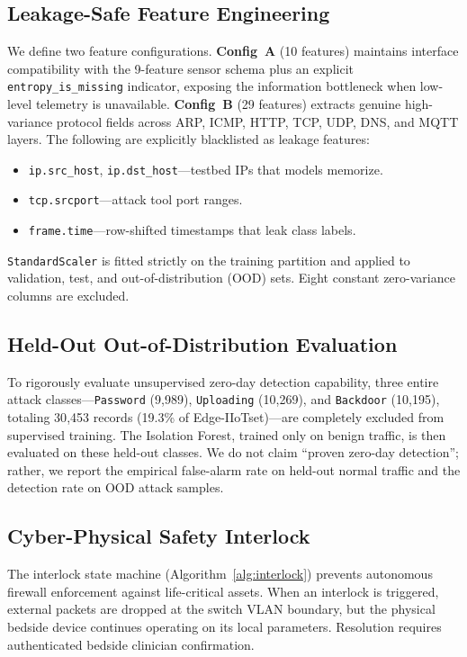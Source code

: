 \documentclass[conference]{IEEEtran}
\begin{document}
\subsection{Leakage-Safe Feature Engineering}
We define two feature configurations. \textbf{Config~A} (10 features) maintains interface compatibility with the 9-feature sensor schema plus an explicit \texttt{entropy\_is\_missing} indicator, exposing the information bottleneck when low-level telemetry is unavailable. \textbf{Config~B} (29 features) extracts genuine high-variance protocol fields across ARP, ICMP, HTTP, TCP, UDP, DNS, and MQTT layers. The following are explicitly blacklisted as leakage features:
\begin{itemize}
    \item \texttt{ip.src\_host}, \texttt{ip.dst\_host}---testbed IPs that models memorize.
    \item \texttt{tcp.srcport}---attack tool port ranges.
    \item \texttt{frame.time}---row-shifted timestamps that leak class labels.
\end{itemize}
\texttt{StandardScaler} is fitted strictly on the training partition and applied to validation, test, and out-of-distribution (OOD) sets. Eight constant zero-variance columns are excluded.

\subsection{Held-Out Out-of-Distribution Evaluation}
To rigorously evaluate unsupervised zero-day detection capability, three entire attack classes---\texttt{Password} (9{,}989), \texttt{Uploading} (10{,}269), and \texttt{Backdoor} (10{,}195), totaling 30{,}453 records (19.3\% of Edge-IIoTset)---are completely excluded from supervised training. The Isolation Forest, trained only on benign traffic, is then evaluated on these held-out classes. We do not claim ``proven zero-day detection''; rather, we report the empirical false-alarm rate on held-out normal traffic and the detection rate on OOD attack samples.

\subsection{Cyber-Physical Safety Interlock}
The interlock state machine (Algorithm~\ref{alg:interlock}) prevents autonomous firewall enforcement against life-critical assets. When an interlock is triggered, external packets are dropped at the switch VLAN boundary, but the physical bedside device continues operating on its local parameters. Resolution requires authenticated bedside clinician confirmation.
\end{document}
